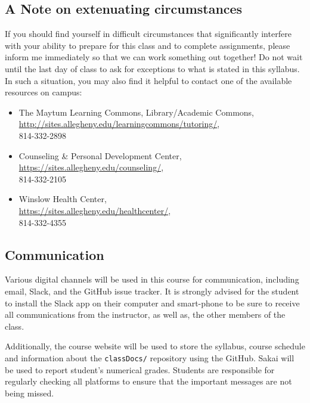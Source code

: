 \documentclass[11pt]{article} %
\begin{document}
\vspace{-.10in}
\subsection*{\textbf{A Note on extenuating circumstances}}

If you should find yourself in difficult circumstances that significantly interfere with your ability to prepare for this class and to complete assignments, please inform me immediately so that we can work something out together! Do not wait until the last day of class to ask for exceptions to what is stated in this syllabus. In such a situation, you may also find it helpful to contact one of the available resources on campus: 
\begin{itemize}
	\item The Maytum Learning Commons, Library/Academic Commons,\\ \url{http://sites.allegheny.edu/learningcommons/tutoring/},\\ 814-332-2898

	\item Counseling \& Personal Development Center,\\ \url{https://sites.allegheny.edu/counseling/},\\ 814-332-2105
	\item Winslow Health Center,\\ \url{https://sites.allegheny.edu/healthcenter/},\\ 814-332-4355
\end{itemize}

\subsection*{\textbf{Communication}}
Various digital channels will be used in this course for communication, including email,
Slack, and the GitHub issue tracker. It is strongly advised for the student to install the Slack app on their computer and smart-phone to be sure to receive all communications from the instructor, as well as, the other members of the class.

Additionally, the course website will be used to store the syllabus, course schedule and information about the {\tt classDocs/} repository using the GitHub. Sakai will be used to report student’s numerical grades. Students are responsible for regularly checking all platforms to ensure that the important messages are not being missed.
\end{document}
